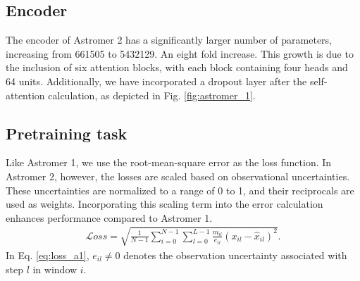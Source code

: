 \subsection{Encoder}
The encoder of Astromer 2 has a significantly larger number of parameters, increasing from \num{661505} to \num{5432129}. An eight fold increase. This growth is due to the inclusion of six attention blocks, with each block containing four heads and 64 units. Additionally, we have incorporated a dropout layer after the self-attention calculation, as depicted in Fig. \ref{fig:astromer_1}.

\subsection{Pretraining task}
Like Astromer 1, we use the root-mean-square error as the loss function. In Astromer 2, however, the losses are scaled based on observational uncertainties. These uncertainties are normalized to a range of 0 to 1, and their reciprocals are used as weights. Incorporating this scaling term into the error calculation enhances performance compared to Astromer 1.
\begin{eqnarray}\label{eq:loss_a1}
    \mathcal{L}oss = \sqrt{\frac{1}{N-1}\sum_{i=0}^{N-1}\sum_{l=0}^{L-1} \frac{m_{il}}{e_{il}}(x_{il} - \hat{x}_{il})^2}.
\end{eqnarray}
In Eq. \ref{eq:loss_a1}, $e_{il} \neq 0$ denotes the observation uncertainty associated with step $l$ in window $i$.